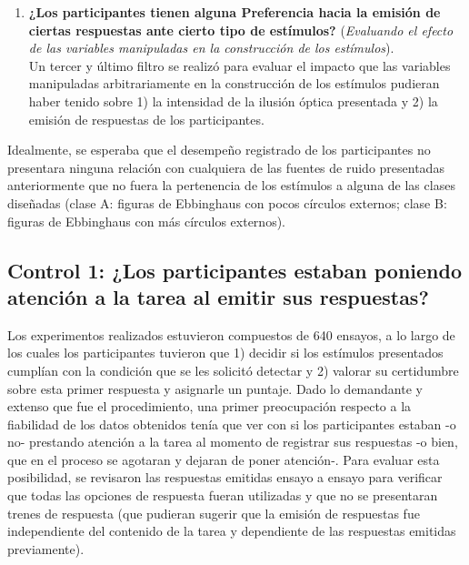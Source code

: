 \begin{enumerate}
\item \textbf{¿Los participantes tienen alguna Preferencia hacia la emisión de ciertas respuestas ante cierto tipo de estímulos?} (\textit{Evaluando el efecto de las variables manipuladas en la construcción de los estímulos}).\\

Un tercer y último filtro se realizó para evaluar el impacto que las variables manipuladas arbitrariamente en la construcción de los estímulos pudieran haber tenido sobre 1) la intensidad de la ilusión óptica presentada y 2) la emisión de respuestas de los participantes.\\

\end{enumerate}

Idealmente, se esperaba que el desempeño registrado de los participantes no presentara ninguna relación con cualquiera de las fuentes de ruido presentadas anteriormente que no fuera la pertenencia de los estímulos a alguna de las clases diseñadas (clase A: figuras de Ebbinghaus con pocos círculos externos; clase B: figuras de Ebbinghaus con más círculos externos).\\












\subsection{Control 1: ¿Los participantes estaban poniendo atención a la tarea al emitir sus respuestas?}

Los experimentos realizados estuvieron compuestos de 640 ensayos, a lo largo de los cuales los participantes tuvieron que 1) decidir si los estímulos presentados cumplían con la condición que se les solicitó detectar y 2) valorar su certidumbre sobre esta primer respuesta y asignarle un puntaje. Dado lo demandante y extenso que fue el procedimiento, una primer preocupación respecto a la fiabilidad de los datos obtenidos tenía que ver con si los participantes estaban -o no- prestando atención a la tarea al momento de registrar sus respuestas -o bien, que en el proceso se agotaran y dejaran de poner atención-. Para evaluar esta posibilidad, se revisaron las respuestas emitidas ensayo a ensayo para verificar que todas las opciones de respuesta fueran utilizadas y que no se presentaran trenes de respuesta (que pudieran sugerir que la emisión de respuestas fue independiente del contenido de la tarea y dependiente de las respuestas emitidas previamente).\\

